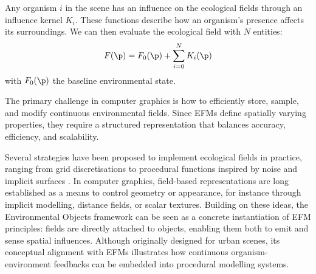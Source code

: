 Any organism $i$ in the scene has an influence on the ecological fields through an influence kernel $K_i$. These functions describe how an organism's presence affects its surroundings. We can then evaluate the ecological field with $N$ entities:
\begin{align}
    \label{eq:env-obj-eco-field-computation}
    F(\p) = F_0(\p) + \sum_{i=0}^{N}{K_i(\p)}
\end{align}
with $F_0(\p)$ the baseline environmental state.



The primary challenge in computer graphics is how to efficiently store, sample, and modify continuous environmental fields. Since EFMs define spatially varying properties, they require a structured representation that balances accuracy, efficiency, and scalability.

Several strategies have been proposed to implement ecological fields in practice, ranging from grid discretisations \cite{Wu1985,Seidl2012} to procedural functions inspired by noise and implicit surfaces \cite{Perlin1985,Frisken2000}. In computer graphics, field-based representations are long established as a means to control geometry or appearance, for instance through implicit modelling, distance fields, or scalar textures. Building on these ideas, the Environmental Objects framework \cite{Grosbellet2016} can be seen as a concrete instantiation of EFM principles: fields are directly attached to objects, enabling them both to emit and sense spatial influences. Although originally designed for urban scenes, its conceptual alignment with EFMs illustrates how continuous organism-environment feedbacks can be embedded into procedural modelling systems.


